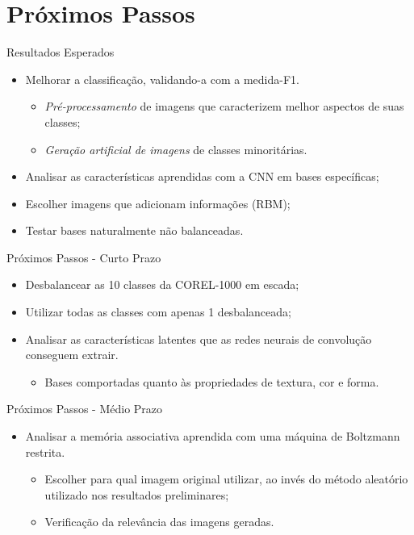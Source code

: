 \documentclass{beamer}
\begin{document}
\section{Próximos Passos}
\begin{frame}{Resultados Esperados}
\setlength\leftmargini{0em}

\begin{itemize}
\item Melhorar a classificação, validando-a com a medida-F1. 
\begin{itemize}
\item \textit{Pré-processamento} de imagens que caracterizem melhor aspectos de suas classes;
\item \textit{Geração artificial de imagens} de classes minoritárias.
\end{itemize}
\item Analisar as características aprendidas com a CNN em bases específicas; 
\item Escolher imagens que adicionam informações (RBM);
\item Testar bases naturalmente não balanceadas.
\end{itemize}
\end{frame}
\begin{frame}{Próximos Passos - Curto Prazo}
\setlength\leftmargini{0em}
\justifying
  \begin{itemize}
  \item Desbalancear as 10 classes da COREL-1000 em escada;
  \item Utilizar todas as classes com apenas 1 desbalanceada;
  \item Analisar as características latentes que as redes neurais de convolução conseguem extrair.
    \begin{itemize}
      \item Bases comportadas quanto às propriedades de textura, cor e forma.
    \end{itemize}
  \end{itemize}
\end{frame}
\begin{frame}{Próximos Passos - Médio Prazo}
\setlength\leftmargini{0em}
\justifying
  \begin{itemize}
  \item Analisar a memória associativa aprendida com uma máquina de Boltzmann restrita.
  \begin{itemize}
    \item Escolher para qual imagem original utilizar, ao invés do método aleatório utilizado nos resultados preliminares;
    \item Verificação da relevância das imagens geradas.
  \end{itemize}
  \end{itemize}
\end{frame}
\end{document}
